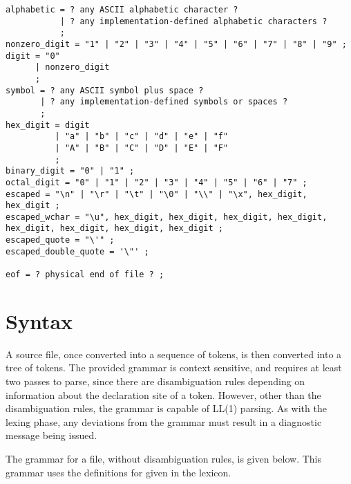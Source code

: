 \documentclass[letterpaper,12pt]{book}
\begin{document}
\begin{lstlisting}[breaklines=true]
alphabetic = ? any ASCII alphabetic character ?
           | ? any implementation-defined alphabetic characters ?
           ;
nonzero_digit = "1" | "2" | "3" | "4" | "5" | "6" | "7" | "8" | "9" ;
digit = "0"
      | nonzero_digit
      ;
symbol = ? any ASCII symbol plus space ?
       | ? any implementation-defined symbols or spaces ?
       ;
hex_digit = digit
          | "a" | "b" | "c" | "d" | "e" | "f"
          | "A" | "B" | "C" | "D" | "E" | "F"
          ;
binary_digit = "0" | "1" ;
octal_digit = "0" | "1" | "2" | "3" | "4" | "5" | "6" | "7" ;
escaped = "\n" | "\r" | "\t" | "\0" | "\\" | "\x", hex_digit, hex_digit ;
escaped_wchar = "\u", hex_digit, hex_digit, hex_digit, hex_digit, hex_digit, hex_digit, hex_digit, hex_digit ;
escaped_quote = "\'" ;
escaped_double_quote = '\"' ;

eof = ? physical end of file ? ;
\end{lstlisting}

\chapter{Syntax}

A source file, once converted into a sequence of tokens, is then converted into a tree of tokens. The provided grammar is context sensitive, and requires at least two passes to parse, since there are disambiguation rules depending on information about the declaration site of a token. However, other than the disambiguation rules, the grammar is capable of LL(1) parsing. As with the lexing phase, any deviations from the grammar must result in a diagnostic message being issued.

The grammar for a file, without disambiguation rules, is given below. This grammar uses the definitions for given in the lexicon.
\end{document}
